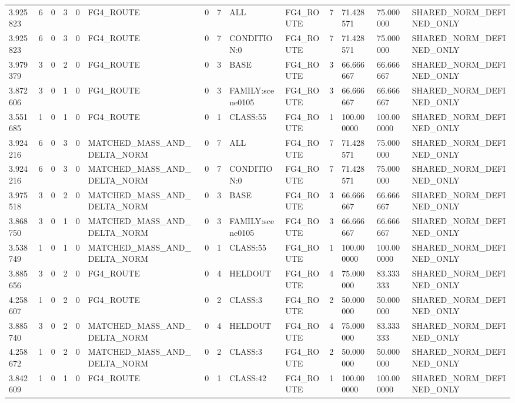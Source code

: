 \begin{tabular}{llllllllllllll}
3.925823 & 6 & 0 & 3 & 0 & FG4\_ROUTE & 0 & 7 & ALL & FG4\_ROUTE & 7 & 71.428571 & 75.000000 & SHARED\_NORM\_DEFINED\_ONLY \\
3.925823 & 6 & 0 & 3 & 0 & FG4\_ROUTE & 0 & 7 & CONDITION:0 & FG4\_ROUTE & 7 & 71.428571 & 75.000000 & SHARED\_NORM\_DEFINED\_ONLY \\
3.979379 & 3 & 0 & 2 & 0 & FG4\_ROUTE & 0 & 3 & BASE & FG4\_ROUTE & 3 & 66.666667 & 66.666667 & SHARED\_NORM\_DEFINED\_ONLY \\
3.872606 & 3 & 0 & 1 & 0 & FG4\_ROUTE & 0 & 3 & FAMILY:scene0105 & FG4\_ROUTE & 3 & 66.666667 & 66.666667 & SHARED\_NORM\_DEFINED\_ONLY \\
3.551685 & 1 & 0 & 1 & 0 & FG4\_ROUTE & 0 & 1 & CLASS:55 & FG4\_ROUTE & 1 & 100.000000 & 100.000000 & SHARED\_NORM\_DEFINED\_ONLY \\
3.924216 & 6 & 0 & 3 & 0 & MATCHED\_MASS\_AND\_DELTA\_NORM & 0 & 7 & ALL & FG4\_ROUTE & 7 & 71.428571 & 75.000000 & SHARED\_NORM\_DEFINED\_ONLY \\
3.924216 & 6 & 0 & 3 & 0 & MATCHED\_MASS\_AND\_DELTA\_NORM & 0 & 7 & CONDITION:0 & FG4\_ROUTE & 7 & 71.428571 & 75.000000 & SHARED\_NORM\_DEFINED\_ONLY \\
3.975518 & 3 & 0 & 2 & 0 & MATCHED\_MASS\_AND\_DELTA\_NORM & 0 & 3 & BASE & FG4\_ROUTE & 3 & 66.666667 & 66.666667 & SHARED\_NORM\_DEFINED\_ONLY \\
3.868750 & 3 & 0 & 1 & 0 & MATCHED\_MASS\_AND\_DELTA\_NORM & 0 & 3 & FAMILY:scene0105 & FG4\_ROUTE & 3 & 66.666667 & 66.666667 & SHARED\_NORM\_DEFINED\_ONLY \\
3.538749 & 1 & 0 & 1 & 0 & MATCHED\_MASS\_AND\_DELTA\_NORM & 0 & 1 & CLASS:55 & FG4\_ROUTE & 1 & 100.000000 & 100.000000 & SHARED\_NORM\_DEFINED\_ONLY \\
3.885656 & 3 & 0 & 2 & 0 & FG4\_ROUTE & 0 & 4 & HELDOUT & FG4\_ROUTE & 4 & 75.000000 & 83.333333 & SHARED\_NORM\_DEFINED\_ONLY \\
4.258607 & 1 & 0 & 2 & 0 & FG4\_ROUTE & 0 & 2 & CLASS:3 & FG4\_ROUTE & 2 & 50.000000 & 50.000000 & SHARED\_NORM\_DEFINED\_ONLY \\
3.885740 & 3 & 0 & 2 & 0 & MATCHED\_MASS\_AND\_DELTA\_NORM & 0 & 4 & HELDOUT & FG4\_ROUTE & 4 & 75.000000 & 83.333333 & SHARED\_NORM\_DEFINED\_ONLY \\
4.258672 & 1 & 0 & 2 & 0 & MATCHED\_MASS\_AND\_DELTA\_NORM & 0 & 2 & CLASS:3 & FG4\_ROUTE & 2 & 50.000000 & 50.000000 & SHARED\_NORM\_DEFINED\_ONLY \\
3.842609 & 1 & 0 & 1 & 0 & FG4\_ROUTE & 0 & 1 & CLASS:42 & FG4\_ROUTE & 1 & 100.000000 & 100.000000 & SHARED\_NORM\_DEFINED\_ONLY \\

\end{tabular}
